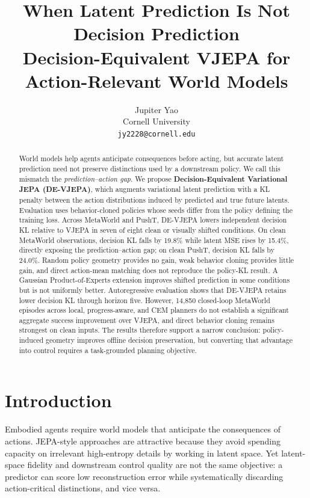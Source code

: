 \documentclass[10pt,twocolumn]{article}
\title{%
  \vspace{-1em}%
  {\large\bfseries When Latent Prediction Is Not Decision Prediction\\[4pt]
  Decision-Equivalent VJEPA for Action-Relevant World Models}%
}
\author{%
  Jupiter Yao\\
  Cornell University\\
  \texttt{jy2228@cornell.edu}
}
\date{}
\theoremstyle{tightstyle}
\begin{document}
\maketitle
\thispagestyle{empty}

\begin{abstract}
\noindent
World models help agents anticipate consequences before acting, but accurate
latent prediction need not preserve distinctions used by a downstream policy.
We call this mismatch the \emph{prediction--action gap}.
We propose \textbf{Decision-Equivalent Variational JEPA (DE-VJEPA)}, which
augments variational latent prediction with a KL penalty between the action
distributions induced by predicted and true future latents. Evaluation uses
behavior-cloned policies whose seeds differ from the policy defining the training
loss. Across MetaWorld and PushT, DE-VJEPA lowers independent decision KL relative
to VJEPA in seven of eight clean or visually shifted conditions. On clean
MetaWorld observations, decision KL falls by 19.8\% while latent MSE rises by
15.4\%, directly exposing the prediction--action gap; on clean PushT, decision KL
falls by 24.0\%. Random policy geometry provides no gain, weak behavior cloning
provides little gain, and direct action-mean matching does not reproduce the
policy-KL result. A Gaussian Product-of-Experts extension improves shifted
prediction in some conditions but is not uniformly better. Autoregressive
evaluation shows that DE-VJEPA retains lower decision KL through horizon five.
However, 14,850 closed-loop MetaWorld episodes across local, progress-aware, and
CEM planners do not establish a significant aggregate success improvement over
VJEPA, and direct behavior cloning remains strongest on clean inputs. The results
therefore support a narrow conclusion: policy-induced geometry improves offline
decision preservation, but converting that advantage into control requires a
task-grounded planning objective.
\end{abstract}

\section{Introduction}

Embodied agents require world models that anticipate the consequences of actions.
JEPA-style approaches \citep{lecun2022path,assran2023ijepa,bardes2024vjepa,assran2025vjepa2} are attractive because they avoid spending
capacity on irrelevant high-entropy details by working in latent space.
Yet latent-space fidelity and downstream control quality are not the same objective:
a predictor can score low reconstruction error while systematically discarding
action-critical distinctions, and vice versa.
\end{document}
